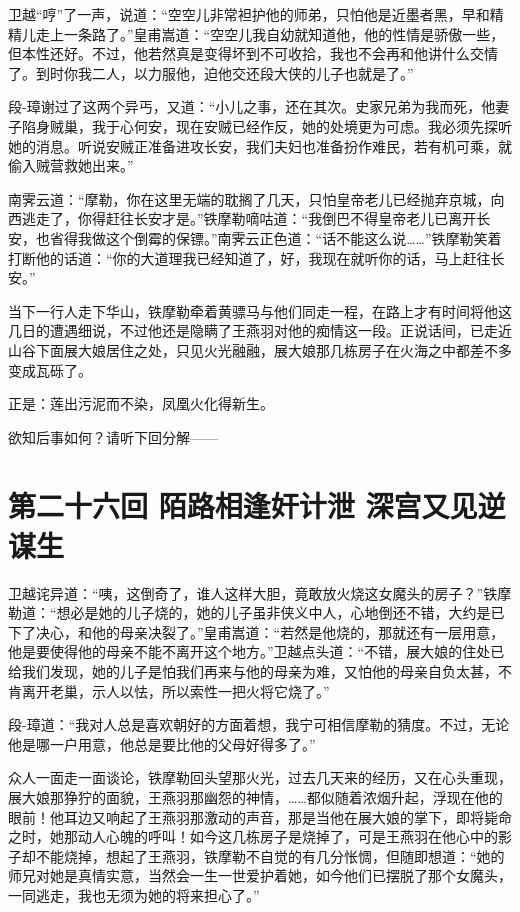 \documentclass[12pt,oneside]{book}
\begin{document}
卫越``哼''了一声，说道：``空空儿非常袒护他的师弟，只怕他是近墨者黑，早和精精儿走上一条路了。''皇甫嵩道：``空空儿我自幼就知道他，他的性情是骄傲一些，但本性还好。不过，他若然真是变得坏到不可收拾，我也不会再和他讲什么交情了。到时你我二人，以力服他，迫他交还段大侠的儿子也就是了。''

段-璋谢过了这两个异丐，又道：``小儿之事，还在其次。史家兄弟为我而死，他妻子陷身贼巢，我于心何安，现在安贼已经作反，她的处境更为可虑。我必须先探听她的消息。听说安贼正准备进攻长安，我们夫妇也准备扮作难民，若有机可乘，就偷入贼营救她出来。''

南霁云道：``摩勒，你在这里无端的耽搁了几天，只怕皇帝老儿已经抛弃京城，向西逃走了，你得赶往长安才是。''铁摩勒嘀咕道：``我倒巴不得皇帝老儿已离开长安，也省得我做这个倒霉的保镖。''南霁云正色道：``话不能这么说\ldots\ldots{}''铁摩勒笑着打断他的话道：``你的大道理我已经知道了，好，我现在就听你的话，马上赶往长安。''

当下一行人走下华山，铁摩勒牵着黄骠马与他们同走一程，在路上才有时间将他这几日的遭遇细说，不过他还是隐瞒了王燕羽对他的痴情这一段。正说话间，已走近山谷下面展大娘居住之处，只见火光融融，展大娘那几栋房子在火海之中都差不多变成瓦砾了。

正是：莲出污泥而不染，凤凰火化得新生。

欲知后事如何？请听下回分解------

\chapter{第二十六回 陌路相逢奸计泄
深宫又见逆谋生}\label{ux7b2cux4e8cux5341ux516dux56de-ux964cux8defux76f8ux9022ux5978ux8ba1ux6cc4-ux6df1ux5babux53c8ux89c1ux9006ux8c0bux751f}

卫越诧异道：``咦，这倒奇了，谁人这样大胆，竟敢放火烧这女魔头的房子？''铁摩勒道：``想必是她的儿子烧的，她的儿子虽非侠义中人，心地倒还不错，大约是已下了决心，和他的母亲决裂了。''皇甫嵩道：``若然是他烧的，那就还有一层用意，他是要使得他的母亲不能不离开这个地方。''卫越点头道：``不错，展大娘的住处已给我们发现，她的儿子是怕我们再来与他的母亲为难，又怕他的母亲自负太甚，不肯离开老巢，示人以怯，所以索性一把火将它烧了。''

段-璋道：``我对人总是喜欢朝好的方面着想，我宁可相信摩勒的猜度。不过，无论他是哪一户用意，他总是要比他的父母好得多了。''

众人一面走一面谈论，铁摩勒回头望那火光，过去几天来的经历，又在心头重现，展大娘那狰狞的面貌，王燕羽那幽怨的神情，\ldots\ldots 都似随着浓烟升起，浮现在他的眼前！他耳边又响起了王燕羽那激动的声音，那是当他在展大娘的掌下，即将毙命之时，她那动人心魄的呼叫！如今这几栋房子是烧掉了，可是王燕羽在他心中的影子却不能烧掉，想起了王燕羽，铁摩勒不自觉的有几分怅惆，但随即想道：``她的师兄对她是真情实意，当然会一生一世爱护着她，如今他们已摆脱了那个女魔头，一同逃走，我也无须为她的将来担心了。''
\end{document}
